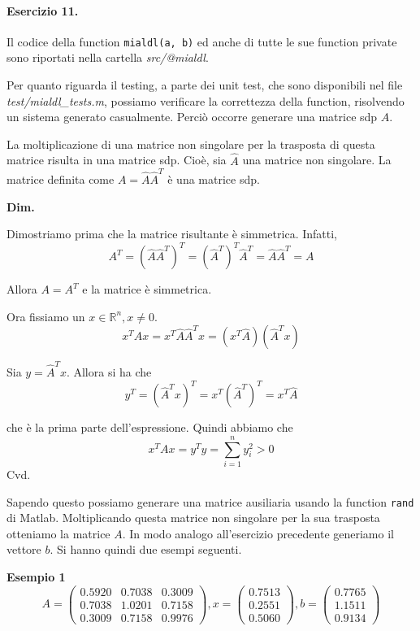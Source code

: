 \paragraph{Esercizio 11.} Il codice della function \verb|mialdl(a, b)| ed anche di tutte le sue function private sono riportati nella cartella \emph{src/@mialdl}.

Per quanto riguarda il testing, a parte dei unit test, che sono disponibili nel file \emph{test/mialdl\_tests.m}, possiamo verificare la correttezza della function, risolvendo un sistema generato casualmente. Perciò occorre generare una matrice sdp $A$.

La moltiplicazione di una matrice non singolare per la trasposta di questa matrice risulta in una matrice sdp. Cioè, sia $\hat{A}$ una matrice non singolare. La matrice definita come $A = \hat{A} \hat{A}^T$ è una matrice sdp.

\textbf{Dim.}

Dimostriamo prima che la matrice risultante è simmetrica. Infatti,
\[
A^T = (\hat{A}\hat{A}^T)^T = (\hat{A}^T)^T\hat{A}^T = \hat{A}\hat{A}^T = A
\]

Allora $A = A^T$ e la matrice è simmetrica.

Ora fissiamo un $x \in \mathbb{R}^n, x \neq 0$.
\[
x^T A x = x^T \hat{A} \hat{A}^T x = (x^T \hat{A}) (\hat{A}^T x)
\]

Sia $y = \hat{A}^T x$. Allora si ha che
\[
y^T = (\hat{A}^Tx)^T = x^T(\hat{A}^T)^T = x^T\hat{A}
\]

che è la prima parte dell'espressione. Quindi abbiamo che
\[
x^TAx = y^T y = \sum_{i=1}^{n} y_{i}^2 > 0
\]
Cvd.

Sapendo questo possiamo generare una matrice ausiliaria usando la function \verb|rand| di Matlab. Moltiplicando questa matrice non singolare per la sua trasposta otteniamo la matrice $A$. In modo analogo all'esercizio precedente generiamo il vettore $b$. Si hanno quindi due esempi seguenti.

\textbf{Esempio 1}
\[
A = \begin{pmatrix}
0.5920 & 0.7038 & 0.3009\\
0.7038 & 1.0201 & 0.7158\\
0.3009 & 0.7158 & 0.9976
\end{pmatrix}, x = \begin{pmatrix}
0.7513\\
0.2551\\
0.5060
\end{pmatrix}, b = \begin{pmatrix}
0.7765\\
1.1511\\
0.9134
\end{pmatrix}
\]

